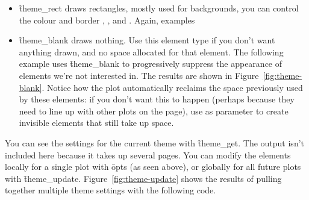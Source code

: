 \begin{itemize}
  \item \f{theme_rect} draws rectangles, mostly used for backgrounds, you can control the  colour and border , , and .  Again, examples 
  
    

  \item \f{theme_blank} draws nothing.  Use this element type if you don't want anything drawn, and no space allocated for that element.  The following example uses \f{theme_blank} to progressively suppress the appearance of elements we're not interested in. The results are shown in Figure~\ref{fig:theme-blank}.  Notice how the plot automatically reclaims the space previously used by these elements: if you don't want this to happen (perhaps because they need to line up with other plots on the page), use  as parameter to create invisible elements that still take up space.

    

\end{itemize}

You can see the settings for the current theme with \f{theme_get}.  The output isn't included here because it takes up several pages.  You can modify the elements locally for a single plot with \f{opts} (as seen above), or globally for all future plots with \f{theme_update}.  Figure~\ref{fig:theme-update} shows the results of pulling together multiple theme settings with the following code.


